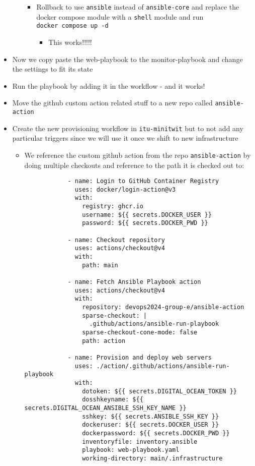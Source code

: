 \begin{itemize}
\begin{itemize}
\begin{itemize}
            \item Rollback to use \texttt{ansible} instead of \texttt{ansible-core} and replace the docker compose module with a \texttt{shell} module and run \texttt{docker\ compose\ up\ -d}

            \begin{itemize}
                \item This works!!!!!
            \end{itemize}
        \end{itemize}
    \end{itemize}
    \item Now we copy paste the web-playbook to the monitor-playbook and change the settings to fit its state
    \item Run the playbook by adding it in the workflow - and it works!
    \item Move the github custom action related stuff to a new repo called \texttt{ansible-action}
    \item Create the new provisioning workflow in \texttt{itu-minitwit} but to not add any particular triggers since we will use it once we shift to new infrastructure

    \begin{itemize}
        \item We reference the custom github action from the repo \texttt{ansible-action} by doing multiple checkouts and reference to the path it is checked out to:

        \begin{verbatim}
            - name: Login to GitHub Container Registry
              uses: docker/login-action@v3
              with:
                registry: ghcr.io
                username: ${{ secrets.DOCKER_USER }}
                password: ${{ secrets.DOCKER_PWD }}

            - name: Checkout repository
              uses: actions/checkout@v4
              with:
                path: main

            - name: Fetch Ansible Playbook action
              uses: actions/checkout@v4
              with:
                repository: devops2024-group-e/ansible-action
                sparse-checkout: |
                  .github/actions/ansible-run-playbook
                sparse-checkout-cone-mode: false
                path: action

            - name: Provision and deploy web servers
              uses: ./action/.github/actions/ansible-run-playbook
              with:
                dotoken: ${{ secrets.DIGITAL_OCEAN_TOKEN }}
                dosshkeyname: ${{ secrets.DIGITAL_OCEAN_ANSIBLE_SSH_KEY_NAME }}
                sshkey: ${{ secrets.ANSIBLE_SSH_KEY }}
                dockeruser: ${{ secrets.DOCKER_USER }}
                dockerpassword: ${{ secrets.DOCKER_PWD }}
                inventoryfile: inventory.ansible
                playbook: web-playbook.yaml
                working-directory: main/.infrastructure
        \end{verbatim}
    \end{itemize}
\end{itemize}

